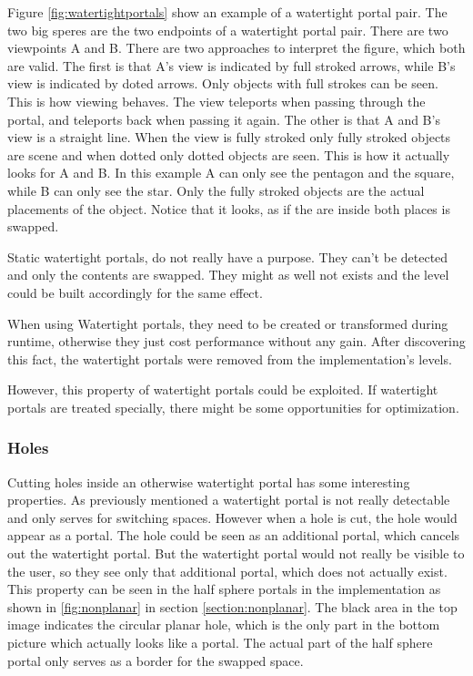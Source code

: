 Figure \ref{fig:watertightportals} show an example of a watertight portal pair. The two big speres are the two endpoints of a watertight portal pair. There are two viewpoints A and B.
There are two approaches to interpret the figure, which both are valid.
The first is that A's view is indicated by full stroked arrows, while B's view is indicated by doted arrows.  Only objects with full strokes can be seen. This is how viewing behaves. The view teleports when passing through the portal, and teleports back when passing it again.
The other is that A and B's view is a straight line. When the view is fully stroked only fully stroked objects are scene and when dotted only dotted objects are seen. This is how it actually looks for A and B.
In this example A can only see the pentagon and the square, while B can only see the star. Only the fully stroked objects are the actual placements of the object. Notice that it looks, as if the are inside both places is swapped.

Static watertight portals, do not really have a purpose. They can't be detected and only the contents are swapped. They might as well not exists and the level could be built accordingly for the same effect.

When using Watertight portals, they need to be created or transformed during runtime, otherwise they just cost performance without any gain. After discovering this fact, the watertight portals were removed from the implementation's levels.

However, this property of watertight portals could be exploited. If watertight portals are treated specially, there might be some opportunities for optimization.

\subsubsection{Holes}
Cutting holes inside an otherwise watertight portal has some interesting properties. As previously mentioned a watertight portal is not really detectable and only serves for switching spaces. However when a hole is cut, the hole would appear as a portal. The hole could be seen as an additional portal, which cancels out the watertight portal. But the watertight portal would not really be visible to the user, so they see only that additional portal, which does not actually exist. This property can be seen in the half sphere portals in the implementation as shown in \ref{fig:nonplanar} in section \ref{section:nonplanar}. The black area in the top image indicates the circular planar hole, which is the only part in the bottom picture which actually looks like a portal. The actual part of the half sphere portal only serves as a border for the swapped space.
